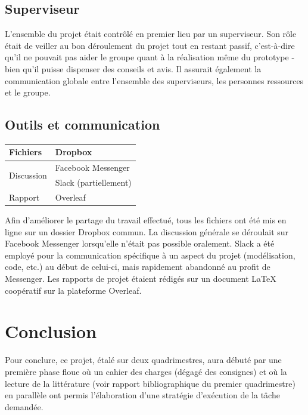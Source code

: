 \documentclass[a4paper,11pt]{article}
\begin{document}
\subsection{Superviseur}

L'ensemble du projet était contrôlé en premier lieu par un superviseur. Son rôle était de veiller au bon déroulement du projet tout en restant passif, c'est-à-dire qu'il ne pouvait pas aider le groupe quant à la réalisation même du prototype - bien qu'il puisse dispenser des conseils et avis. Il assurait également la communication globale entre l'ensemble des superviseurs, les personnes ressources et le groupe.

\subsection{Outils et communication}

\vspace{3mm}
\begin{center}
    \begin{tabular}{l | l}
	Fichiers & Dropbox \\ \hline
	\multirow{2}{*}{Discussion} & Facebook Messenger \\
	           & Slack (partiellement)  \\ \hline
	Rapport & Overleaf \\
\end{tabular}
\vspace{5mm}
\end{center}

Afin d'améliorer le partage du travail effectué, tous les fichiers ont été mis en ligne sur un dossier Dropbox commun. La discussion générale se déroulait sur Facebook Messenger lorsqu'elle n'était pas possible oralement. Slack a été employé pour la communication spécifique à un aspect du projet (modélisation, code, etc.) au début de celui-ci, mais rapidement abandonné au profit de Messenger. Les rapports de projet étaient rédigés sur un document LaTeX coopératif sur la plateforme Overleaf.
\cleardoublepage

\section{Conclusion}

Pour conclure, ce projet, étalé sur deux quadrimestres, aura débuté par une première phase floue où un cahier des charges (dégagé des consignes) et où la lecture de la littérature (voir rapport bibliographique du premier quadrimestre) en parallèle ont permis l'élaboration d'une stratégie d'exécution de la tâche demandée.
\end{document}
